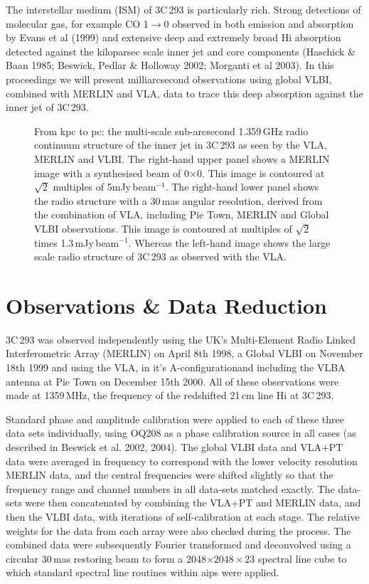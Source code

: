 \documentclass{evn2004}
\begin{document}
The interstellar medium (ISM) of 3C\,293 is particularly rich. Strong detections of
molecular gas, for example CO 1$\rightarrow0$ observed in both
emission and absorption by Evans et al (1999) and extensive deep and
extremely broad H{\sc i} absorption detected against the kiloparsec
scale inner jet and core components (Haschick \& Baan 1985; Beswick,
Pedlar \& Holloway 2002; Morganti et al 2003). In this proceedings we
will present milliarcsecond observations using global VLBI, combined
with MERLIN and VLA, data to trace this deep absorption against the
inner jet of 3C\,293.

\begin{figure*}
   \centering
  \vspace{257pt}
  
 \caption{From kpc to pc: the multi-scale sub-arcsecond 1.359\,GHz radio continuum
structure of the inner jet in 3C\,293 as seen by the VLA, MERLIN and VLBI. The
right-hand upper panel shows a MERLIN image with a synthesised beam of
0$\times$0. This image is contoured at $\sqrt2$
multiples of 5mJy\,beam$^{-1}$. The right-hand lower panel shows the radio
structure with a 30\,mas angular resolution, derived from the
combination of VLA, including Pie Town, MERLIN and Global VLBI
observations. This image is contoured at multiples of $\sqrt2$ times
1.3\,mJy\,beam$^{-1}$. Whereas the left-hand image shows the large
scale radio structure of 3C\,293 as observed with the VLA. 
         \label{fig1}
         }
  \end{figure*}
\section{Observations \& Data Reduction}

3C\,293 was observed independently using the UK's Multi-Element Radio
Linked Interferometric Array (MERLIN) on April 8th 1998, a Global VLBI on
November 18th 1999 and using the VLA, in it's A-configurationand
including the VLBA antenna at Pie Town on December 15th 2000. All of
these observations were made at 1359\,MHz, the frequency of the
redshifted 21\,cm line H{\sc i} at 3C\,293.

Standard phase and amplitude calibration were applied to each of these
three data sets individually, using OQ208 as a phase calibration
source in all cases (as described in Beswick et al. 2002, 2004). The global VLBI data and VLA$+$PT data were averaged in frequency to
correspond with the lower velocity resolution MERLIN data, and the central
frequencies were shifted slightly so that the frequency range and channel
numbers in all data-sets matched exactly. The data-sets were then
concatenated by combining the VLA$+$PT and MERLIN data, and then the VLBI
data, with iterations of self-calibration at each stage.  The relative
weights for the data from each array were also checked during the process.
The combined data were subsequently Fourier transformed and deconvolved
using a circular 30\,mas restoring beam to form a 2048$\times2048\times$23
spectral line cube to which standard spectral line routines within {\sc
aips} were applied.
\end{document}
